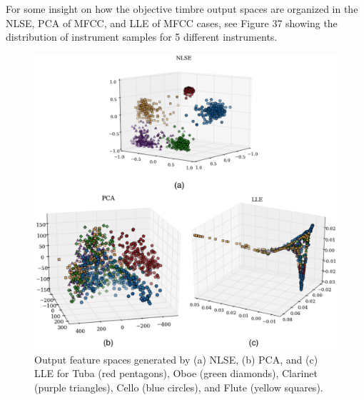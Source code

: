\documentclass[12pt]{report} 	%
\numberwithin{figure}{chapter}
\numberwithin{table}{chapter}
\numberwithin{equation}{chapter}
\begin{document}
\begin{flushleft}
For some insight on how the objective timbre output spaces are organized in the NLSE, PCA of MFCC, and LLE of MFCC cases, see Figure 37 showing the distribution of instrument samples for 5 different instruments.
\begin{figure}[h!]
\begin{center}
\includegraphics[width=\linewidth]{NLSECluster}
\caption[NLSE vs. PCA vs. LLE instrument clusters]{Output feature spaces generated by (a) NLSE, (b) PCA, and (c) LLE for Tuba (red pentagons), Oboe (green diamonds), Clarinet (purple triangles), Cello (blue circles), and Flute (yellow squares).}
\end{center}
\vspace{6pt}
\end{figure}


\end{flushleft}
\end{document}

